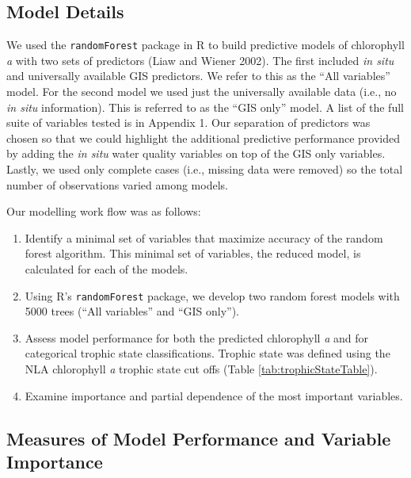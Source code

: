 \documentclass[12pt,]{article}
\begin{document}
\subsection{Model Details}\label{model-details}

We used the \texttt{randomForest} package in R to build predictive
models of chlorophyll \emph{a} with two sets of predictors (Liaw and
Wiener 2002). The first included \emph{in situ} and universally
available GIS predictors. We refer to this as the ``All variables''
model. For the second model we used just the universally available data
(i.e., no \emph{in situ} information). This is referred to as the ``GIS
only'' model. A list of the full suite of variables tested is in
Appendix 1. Our separation of predictors was chosen so that we could
highlight the additional predictive performance provided by adding the
\emph{in situ} water quality variables on top of the GIS only variables.
Lastly, we used only complete cases (i.e., missing data were removed) so
the total number of observations varied among models.

Our modelling work flow was as follows:

\begin{enumerate}
\def\labelenumi{\arabic{enumi}.}
\itemsep1pt\parskip0pt
\item
  Identify a minimal set of variables that maximize accuracy of the
  random forest algorithm. This minimal set of variables, the reduced
  model, is calculated for each of the models.
\item
  Using R's \texttt{randomForest} package, we develop two random forest
  models with 5000 trees (``All variables'' and ``GIS only'').
\item
  Assess model performance for both the predicted chlorophyll \emph{a}
  and for categorical trophic state classifications. Trophic state was
  defined using the NLA chlorophyll \emph{a} trophic state cut offs
  (Table \ref{tab:trophicStateTable}).
\item
  Examine importance and partial dependence of the most important
  variables.
\end{enumerate}

\subsection{Measures of Model Performance and Variable
Importance}\label{measures-of-model-performance-and-variable-importance}
\end{document}
